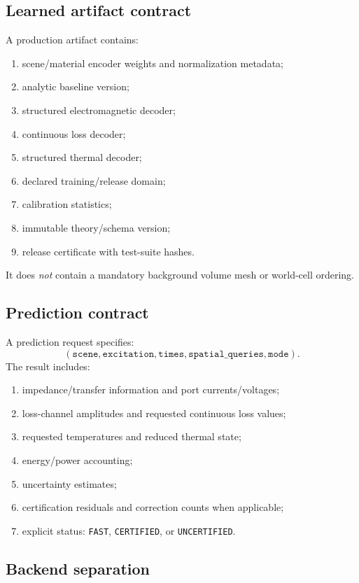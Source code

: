 \subsection{Learned artifact contract}

A production artifact contains:
\begin{enumerate}
\item scene/material encoder weights and normalization metadata;
\item analytic baseline version;
\item structured electromagnetic decoder;
\item continuous loss decoder;
\item structured thermal decoder;
\item declared training/release domain;
\item calibration statistics;
\item immutable theory/schema version;
\item release certificate with test-suite hashes.
\end{enumerate}

It does \emph{not} contain a mandatory background volume mesh or world-cell
ordering.

\subsection{Prediction contract}

A prediction request specifies:
\[
  (\texttt{scene},\texttt{excitation},\texttt{times},
   \texttt{spatial\_queries},\texttt{mode}).
\]
The result includes:
\begin{enumerate}
\item impedance/transfer information and port currents/voltages;
\item loss-channel amplitudes and requested continuous loss values;
\item requested temperatures and reduced thermal state;
\item energy/power accounting;
\item uncertainty estimates;
\item certification residuals and correction counts when applicable;
\item explicit status: \texttt{FAST}, \texttt{CERTIFIED}, or
      \texttt{UNCERTIFIED}.
\end{enumerate}

\subsection{Backend separation}

